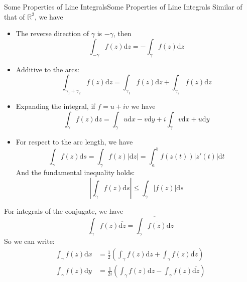 \documentclass[../main.tex]{subfiles}
\begin{document}
\begin{proposition}{Some Properties of Line Integrals}{Some Properties of Line Integrals}
Similar of that of $\mathbb{R}^2$, we have
\begin{itemize}
	\item The reverse direction of $\gamma$ is $-\gamma$, then
		\begin{equation}
			\int_{-\gamma} f(z) \mathrm{d} z = -\int_{\gamma} f(z) \mathrm{d} z
		\end{equation}
	\item Additive to the arcs:
		\begin{equation}
			\int_{\gamma_1 + \gamma_2} f(z) \mathrm{d} z = \int_{\gamma_1} f(z) \mathrm{d} z + \int_{\gamma_2} f(z) \mathrm{d} z
		\end{equation}
	\item Expanding the integral, if $f=u+iv$ we have
		\begin{equation*}
			\int_{\gamma} f(z) \mathrm{d} z = \int_{\gamma} u \mathrm{d} x - v \mathrm{d} y + i \int_{\gamma} v \mathrm{d} x + u \mathrm{d} y
		\end{equation*}
	\item For respect to the arc length, we have
		\begin{equation*}
			\int_{\gamma} f(z) \mathrm{d} s = \int_{\gamma} f(z) \left|\mathrm{d} z\right| = \int_a^b f(z(t)) \left|z'(t)\right| \mathrm{d} t
		\end{equation*}
		And the fundamental inequality holds:
		\begin{equation*}
			\left| \int_{\gamma} f(z) \mathrm{d} s \right| \leq \int_{\gamma} |f(z)| \mathrm{d} s
		\end{equation*}
\end{itemize}
\end{proposition}

For integrals of the conjugate, we have
\begin{equation}
	\int_{\gamma} f(z) \overline{\mathrm{d} z} = \overline{\int_{\gamma} \overline{f(z)} \mathrm{d} z}
\end{equation}
So we can write:
\begin{equation*}
\begin{aligned}
	\int_{\gamma}f(z) \mathrm{d} x &= \frac{1}{2} \left( \int_{\gamma} f(z) \mathrm{d} z + \int_{\gamma} f(z) \overline{\mathrm{d} z} \right) \\
	\int_{\gamma}f(z) \mathrm{d} y &= \frac{1}{2i} \left( \int_{\gamma} f(z) \mathrm{d} z - \int_{\gamma} f(z) \overline{\mathrm{d} z} \right)
\end{aligned}
\end{equation*}
\end{document}
